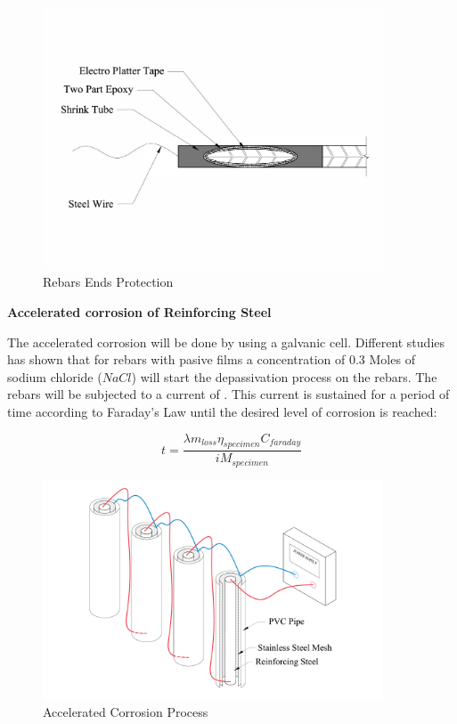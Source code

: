 \begin{figure}[htbp]
	\centering
	\includegraphics[width=0.9\textwidth]{Chapter-4/figs/Rebar_Ends}
	\caption{Rebars Ends Protection}
	\label{fig:RebarEndsProtection}
\end{figure}


\textbf{Accelerated corrosion  of Reinforcing Steel}

The accelerated corrosion will be done by using a galvanic cell. Different studies \cite{Ghods2010} has shown that for rebars with pasive films a concentration of 0.3 Moles of sodium chloride ($NaCl$) will start the depassivation process on the rebars. The rebars will be subjected to a current of . This current is sustained for a period of time according to Faraday's Law until the desired level of corrosion is reached:

\begin{equation}
	t=\frac{\lambda m_{loss} \eta_{specimen} C_{faraday}}{i M_{specimen}}
	\label{eq.FaradayEq}
\end{equation}

\begin{figure}[htbp]
	\centering
	\includegraphics[width=0.9\textwidth]{Chapter-4/figs/AcceleratedCorrosionProcedure}
	\caption{Accelerated Corrosion Process}
	\label{fig:AcceleratedCorrosion}
\end{figure}


